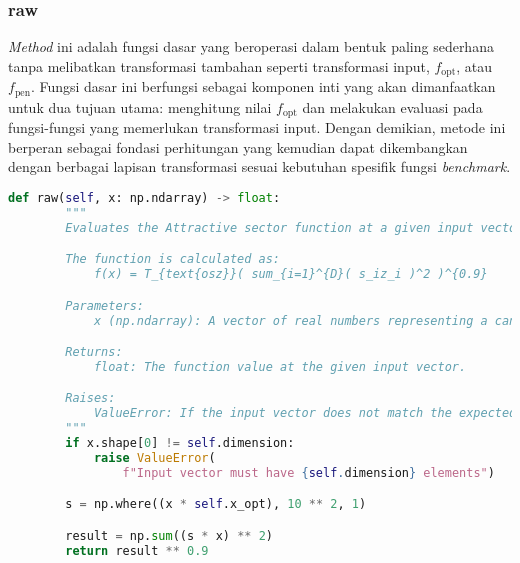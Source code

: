\subsubsection{raw}
\textit{Method} ini adalah fungsi dasar yang beroperasi dalam bentuk paling sederhana tanpa melibatkan transformasi tambahan seperti transformasi input, $f_{\text{opt}}$, atau $f_{\text{pen}}$. Fungsi dasar ini berfungsi sebagai komponen inti yang akan dimanfaatkan untuk dua tujuan utama: menghitung nilai $f_{\text{opt}}$ dan melakukan evaluasi pada fungsi-fungsi yang memerlukan transformasi input. Dengan demikian, metode ini berperan sebagai fondasi perhitungan yang kemudian dapat dikembangkan dengan berbagai lapisan transformasi sesuai kebutuhan spesifik fungsi \textit{benchmark}.
\begin{lstlisting}[language=Python, caption=\textit{method raw} fungsi Attractive sector, label=lst:raw_coco]
    def raw(self, x: np.ndarray) -> float:
        """
        Evaluates the Attractive sector function at a given input vector without any shift.

        The function is calculated as:
            f(x) = T_{text{osz}}( sum_{i=1}^{D}( s_iz_i )^2 )^{0.9}

        Parameters:
            x (np.ndarray): A vector of real numbers representing a candidate solution.

        Returns:
            float: The function value at the given input vector.

        Raises:
            ValueError: If the input vector does not match the expected dimension.
        """
        if x.shape[0] != self.dimension:
            raise ValueError(
                f"Input vector must have {self.dimension} elements")

        s = np.where((x * self.x_opt), 10 ** 2, 1)

        result = np.sum((s * x) ** 2)
        return result ** 0.9
\end{lstlisting}
